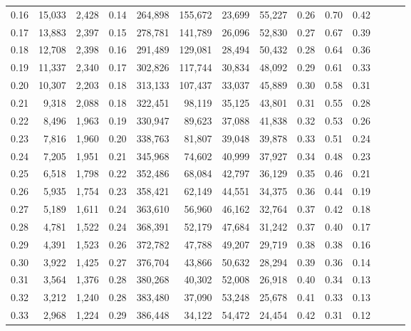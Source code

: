 \begin{tabular}{rrrrrrrrrrrrrr}
0.16 &  15,033 &  2,428 &  0.14 &  264,898 &  155,672 &  23,699 &  55,227 &  0.26 &  0.70 &      0.42 \\
0.17 &  13,883 &  2,397 &  0.15 &  278,781 &  141,789 &  26,096 &  52,830 &  0.27 &  0.67 &      0.39 \\
0.18 &  12,708 &  2,398 &  0.16 &  291,489 &  129,081 &  28,494 &  50,432 &  0.28 &  0.64 &      0.36 \\
0.19 &  11,337 &  2,340 &  0.17 &  302,826 &  117,744 &  30,834 &  48,092 &  0.29 &  0.61 &      0.33 \\
0.20 &  10,307 &  2,203 &  0.18 &  313,133 &  107,437 &  33,037 &  45,889 &  0.30 &  0.58 &      0.31 \\
0.21 &   9,318 &  2,088 &  0.18 &  322,451 &   98,119 &  35,125 &  43,801 &  0.31 &  0.55 &      0.28 \\
0.22 &   8,496 &  1,963 &  0.19 &  330,947 &   89,623 &  37,088 &  41,838 &  0.32 &  0.53 &      0.26 \\
0.23 &   7,816 &  1,960 &  0.20 &  338,763 &   81,807 &  39,048 &  39,878 &  0.33 &  0.51 &      0.24 \\
0.24 &   7,205 &  1,951 &  0.21 &  345,968 &   74,602 &  40,999 &  37,927 &  0.34 &  0.48 &      0.23 \\
0.25 &   6,518 &  1,798 &  0.22 &  352,486 &   68,084 &  42,797 &  36,129 &  0.35 &  0.46 &      0.21 \\
0.26 &   5,935 &  1,754 &  0.23 &  358,421 &   62,149 &  44,551 &  34,375 &  0.36 &  0.44 &      0.19 \\
0.27 &   5,189 &  1,611 &  0.24 &  363,610 &   56,960 &  46,162 &  32,764 &  0.37 &  0.42 &      0.18 \\
0.28 &   4,781 &  1,522 &  0.24 &  368,391 &   52,179 &  47,684 &  31,242 &  0.37 &  0.40 &      0.17 \\
0.29 &   4,391 &  1,523 &  0.26 &  372,782 &   47,788 &  49,207 &  29,719 &  0.38 &  0.38 &      0.16 \\
0.30 &   3,922 &  1,425 &  0.27 &  376,704 &   43,866 &  50,632 &  28,294 &  0.39 &  0.36 &      0.14 \\
0.31 &   3,564 &  1,376 &  0.28 &  380,268 &   40,302 &  52,008 &  26,918 &  0.40 &  0.34 &      0.13 \\
0.32 &   3,212 &  1,240 &  0.28 &  383,480 &   37,090 &  53,248 &  25,678 &  0.41 &  0.33 &      0.13 \\
0.33 &   2,968 &  1,224 &  0.29 &  386,448 &   34,122 &  54,472 &  24,454 &  0.42 &  0.31 &      0.12 \\

\end{tabular}
